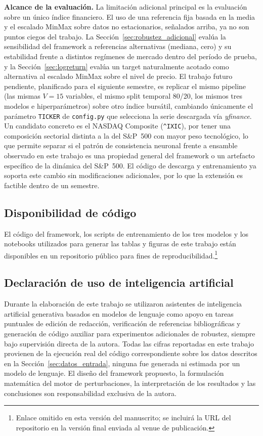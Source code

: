 \documentclass[conference, letterpaper]{IEEEtran}
\begin{document}
\textbf{Alcance de la evaluación.} La limitación adicional principal
es la evaluación sobre un único índice financiero. El uso de una
referencia fija basada en la media y el escalado MinMax sobre datos
no estacionarios, señalados arriba, ya no son puntos ciegos del
trabajo. La Sección~\ref{sec:robustez_adicional} evalúa la
sensibilidad del framework a referencias alternativas (mediana,
cero) y su estabilidad frente a distintos regímenes de mercado
dentro del período de prueba, y la Sección~\ref{sec:logreturn}
evalúa un target naturalmente acotado como alternativa al escalado
MinMax sobre el nivel de precio. El trabajo futuro pendiente, planificado
para el siguiente semestre, es replicar el mismo pipeline
(las mismas $V{=}15$ variables, el mismo split temporal 80/20, los mismos
tres modelos e hiperparámetros) sobre otro índice bursátil, cambiando
únicamente el parámetro \texttt{TICKER} de \texttt{config.py} que
selecciona la serie descargada vía \textit{yfinance}. Un candidato
concreto es el NASDAQ Composite (\texttt{\^{}IXIC}), por tener una
composición sectorial distinta a la del S\&P~500 con mayor peso
tecnológico, lo que permite separar si el patrón de consistencia
neuronal frente a ensamble observado en este trabajo es una propiedad
general del framework o un artefacto específico de la dinámica del
S\&P~500. El código de descarga y entrenamiento ya soporta este cambio
sin modificaciones adicionales, por lo que la extensión es factible
dentro de un semestre.

\subsection{Disponibilidad de código}

El código del framework, los scripts de entrenamiento de los tres
modelos y los notebooks utilizados para generar las tablas y
figuras de este trabajo están disponibles en un repositorio público
para fines de reproducibilidad.\footnote{Enlace omitido en esta
versión del manuscrito; se incluirá la URL del repositorio en la
versión final enviada al venue de publicación.}

\subsection{Declaración de uso de inteligencia artificial}

Durante la elaboración de este trabajo se utilizaron asistentes de
inteligencia artificial generativa basados en modelos de lenguaje
como apoyo en tareas puntuales de edición de redacción, verificación
de referencias bibliográficas y generación de código auxiliar para
experimentos adicionales de robustez, siempre bajo supervisión
directa de la autora. Todas las cifras reportadas en este trabajo
provienen de la ejecución real del código correspondiente sobre los
datos descritos en la Sección~\ref{sec:datos_entrada}, ninguna fue
generada ni estimada por un modelo de lenguaje. El diseño del
framework propuesto, la formulación matemática del motor de
perturbaciones, la interpretación de los resultados y las
conclusiones son responsabilidad exclusiva de la autora.


\end{document}
